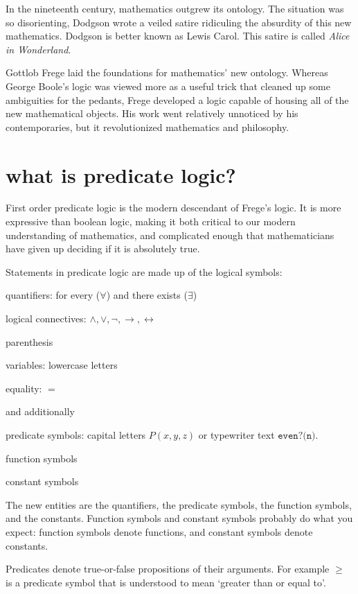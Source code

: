 \documentclass{scrbook}
\renewcommand{\implies}{\to}
\renewcommand{\iff}{\leftrightarrow}
\begin{document}
In the nineteenth century, mathematics outgrew its ontology. The situation was so disorienting, Dodgson wrote a veiled satire ridiculing the absurdity of this new mathematics. Dodgson is better known as Lewis Carol. This satire is called \emph{Alice in Wonderland}.

Gottlob Frege laid the foundations for mathematics' new ontology. Whereas George Boole's logic was viewed more as a useful trick that cleaned up some ambiguities for the pedants, Frege developed a logic capable of housing all of the new mathematical objects. His work went relatively unnoticed by his contemporaries, but it revolutionized mathematics and philosophy. 

\section[What is Predicate Logic?]{what is predicate logic?}
First order predicate logic is the modern descendant of Frege's logic. It is more expressive than boolean logic, making it both critical to our modern understanding of mathematics, and complicated enough that mathematicians have given up deciding if it is absolutely true. 

Statements in predicate logic are made up of the logical symbols:
\begin{trivlist}
\item quantifiers: for every ($\forall$) and there exists ($\exists$)
\item logical connectives: $\wedge,\vee,\neg,\implies,\iff$
\item parenthesis 
\item variables: lowercase letters
\item equality: $=$
\end{trivlist}

and additionally 
\begin{trivlist}
\item predicate symbols: capital letters $P(x,y,z)$ or typewriter text $\texttt{even?(n)}$.
\item function symbols 
\item constant symbols  
\end{trivlist}
The new entities are the quantifiers, the predicate symbols, the function symbols, and the constants. Function symbols and constant symbols probably do what you expect: function symbols denote functions, and constant symbols denote constants. 

Predicates denote true-or-false propositions of their arguments. For example $\geq$ is a predicate symbol that is understood to mean `greater than or equal to'. 
\end{document}
